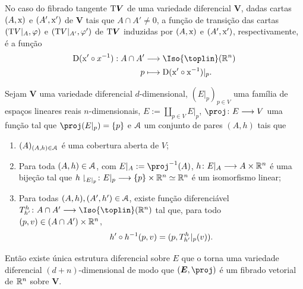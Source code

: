 No caso do fibrado tangente $\mathrm{T} \bm V$ de uma variedade diferencial $\bm V$, dadas cartas $(A,\mathrm{x})$ e $(A',\mathrm{x}')$ de $\bm V$ tais que $A \cap A' \neq 0$, a função de transição das cartas $(\mathrm{T} V|_A,\varphi)$ e $(\mathrm{T} V|_{A'},\varphi')$ de $\mathrm{T} \bm V$ induzidas por $(A,\mathrm{x})$ e $(A',\mathrm{x}')$, respectivamente, é a função
	\begin{align*}
	\func{\D(\x' \circ x\inv)}{A \cap A'}{\Iso{\toplin}(\R^n)}{p}{\D(\x' \circ \x\inv)|_p}.
	\end{align*}

\begin{prop}
\label{topo:atlas.fibrado}
Sejam $\bm V$ uma variedade diferencial $d$-dimensional, $(E|_p)_{p \in V}$ uma família de espaços lineares reais $n$-dimensionais, $E := \coprod_{p \in V} E|_p$, $\proj\colon E \to V$ uma função tal que $\proj(E|_p) = \{p\}$ e $\mathcal{A}$ um conjunto de pares $(A,h)$ tais que
	\begin{enumerate}
	\item $(A)_{(A,h) \in \mathcal{A}}$ é uma cobertura aberta de $V$;
	
	\item Para toda $(A,h) \in \mathcal{A}$, com $E|_A := \proj\inv(A)$, $h\colon E|_A \longrightarrow A \times \mathbb{R}^n$ é uma bijeção tal que $h\downharpoonright_{E|_p}\colon E|_p \longrightarrow \{p\} \times \mathbb{R}^n \simeq \mathbb{R}^n$ é um isomorfismo linear;
	
	\item Para todas $(A,h), (A',h') \in \mathcal{A}$, existe função diferenciável $T^h_{h'}\colon A \cap A' \to \Iso{\toplin}(\R^n)$ tal que, para todo $(p,v) \in (A \cap A') \times \mathbb{R}^n$,
		\begin{equation*}
		h' \circ h^{-1}(p,v) = (p,T^h_{h'}|_p(v)).
		\end{equation*}
	\end{enumerate}
Então existe única estrutura diferencial sobre $E$ que o torna uma variedade diferencial $(d+n)$-dimensional de modo que $(\bm E,\proj)$ é um fibrado vetorial de $\mathbb{R}^n$ sobre $\bm V$.
\end{prop}
